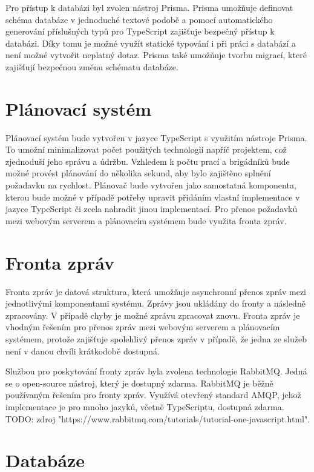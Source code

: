 Pro přístup k databázi byl zvolen nástroj Prisma. Prisma umožňuje definovat schéma databáze v jednoduché textové podobě a pomocí automatického generování
příslušných typů pro TypeScript zajišťuje bezpečný přístup k databázi. Díky tomu je možné využít statické typování i při práci s databází a není možné vytvořit
neplatný dotaz. Prisma také umožňuje tvorbu migrací, které zajišťují bezpečnou změnu schématu databáze. 

\section{Plánovací systém}

Plánovací systém bude vytvořen v jazyce TypeScript s využitím nástroje Prisma. To umožní minimalizovat počet použitých technologií napříč projektem,
což zjednoduší jeho správu a údržbu. Vzhledem k počtu prací a brigádníků bude možné provést plánování do několika sekund, aby bylo zajištěno splnění požadavku na rychlost.
Plánovač bude vytvořen jako samostatná komponenta, kterou bude možné v případě potřeby upravit přidáním vlastní implementace v jazyce TypeScript
či zcela nahradit jinou implementací. 
Pro přenos požadavků mezi webovým serverem a plánovacím systémem bude využita fronta zpráv.

\section{Fronta zpráv}

Fronta zpráv je datová struktura, která umožňuje asynchronní přenos zpráv mezi jednotlivými komponentami systému. Zprávy jsou ukládány do fronty
a následně zpracovány. V případě chyby je možné zprávu zpracovat znovu. Fronta zpráv je vhodným řešením pro přenos zpráv mezi webovým serverem a plánovacím systémem,
protože zajišťuje spolehlivý přenos zpráv v případě, že jedna ze služeb není v danou chvíli krátkodobě dostupná.

Službou pro poskytování fronty zpráv byla zvolena technologie RabbitMQ. Jedná se o open-source nástroj, který je dostupný zdarma. RabbitMQ je běžně používaným řešením
pro fronty zpráv. Využívá otevřený standard AMQP, jehož implementace je pro mnoho jazyků, včetně TypeScriptu, dostupná zdarma. TODO: zdroj "https://www.rabbitmq.com/tutorials/tutorial-one-javascript.html".


\section{Databáze}

